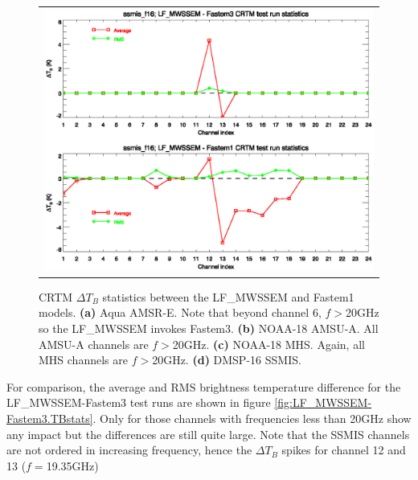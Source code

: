 \begin{figure}[htp]
\begin{tabular}{c}
    \includegraphics[bb=85 225 540 380,clip,scale=0.8]{graphics/Comparison/ssmis_f16.TBstats.eps}
  \end{tabular}
  \caption{CRTM $\Delta T_B$ statistics between the LF\_MWSSEM and Fastem1 models. \textbf{(a)} Aqua AMSR-E. Note that beyond channel 6, $f\!>$20GHz so the LF\_MWSSEM invokes Fastem3. \textbf{(b)} NOAA-18 AMSU-A. All AMSU-A channels are $f\!>$20GHz. \textbf{(c)} NOAA-18 MHS. Again, all MHS channels are $f\!>$20GHz. \textbf{(d)} DMSP-16 SSMIS.}
  \label{fig:LF_MWSSEM-Fastem1.TBstats}
\end{figure}

For comparison, the average and RMS brightness temperature difference for the LF\_MWSSEM-Fastem3 test runs are shown in figure \ref{fig:LF_MWSSEM-Fastem3.TBstats}. Only for those channels with frequencies less than 20GHz show any impact but the differences are still quite large. Note that the SSMIS channels are not ordered in increasing frequency, hence the $\Delta T_B$ spikes for channel 12 and 13 ($f\!=$19.35GHz)

